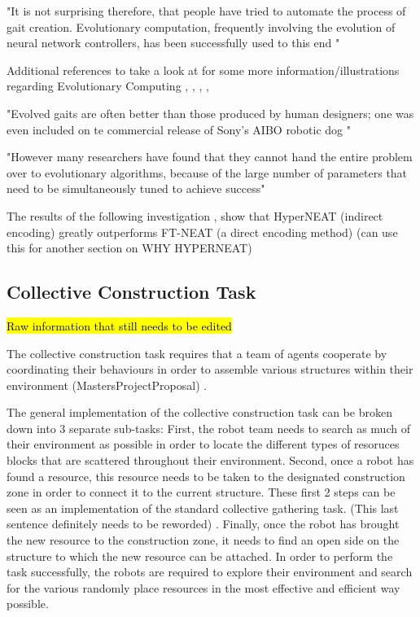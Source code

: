 \documentclass[conference]{IEEEtran}
\begin{document}
"It is not surprising therefore, that people have tried to automate the process of gait creation. Evolutionary computation, frequently involving the evolution of neural network controllers, has been successfully used to this end \cite{clune2009evolving}"

Additional references to take a look at for some more information/illustrations regarding Evolutionary Computing 
\cite{hornby2005autonomous},
\cite{hornby2003generative},
\cite{gruau1994automatic},
\cite{sims1994evolving},

"Evolved gaits are often better than those produced by human designers; one was even included on te commercial release of Sony's AIBO robotic dog \cite{hornby2005autonomous}"

"However many researchers have found that they cannot hand the entire problem over to evolutionary algorithms, because of the large number of parameters that need to be simultaneously tuned to achieve success" \cite{clune2009evolving}

The results of the following investigation \cite{clune2009evolving}, show that HyperNEAT (indirect encoding) greatly outperforms FT-NEAT (a direct encoding method)
(can use this for another section on WHY HYPERNEAT)


\subsection{Collective Construction Task}

\hl{Raw information that still needs to be edited}

The collective construction task requires that a team of agents cooperate by coordinating their behaviours in order to assemble various structures within their environment (MastersProjectProposal) \cite{RefWorks:15}.

The general implementation of the collective construction task can be broken down into 3 separate sub-tasks:
First, the robot team needs to search as much of their environment as possible in order to locate the different types of resoruces blocks that are scattered throughout their environment.
Second, once a robot has found a resource, this resource needs to be taken to the designated construction zone in order to connect it to the current structure. These first 2 steps can be seen as an implementation of the standard collective gathering task. (This last sentence definitely needs to be reworded) \cite{RefWorks15}.
Finally, once the robot has brought the new resource to the construction zone, it needs to find an open side on the structure to which the new resource can be attached.
In order to perform the task successfully, the robots are required to explore their environment and search for the various randomly place resources in the most effective and efficient way possible.
\end{document}
